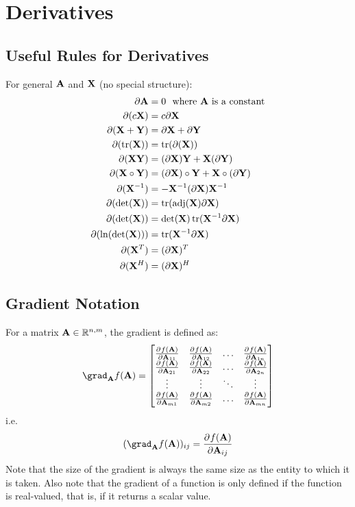 
\chapter{Derivatives}

\section{Useful Rules for Derivatives}
For general $\mathbf{A}$ and $\mathbf{X}$ (no special structure):
\begin{align}
\partial\mathbf{A}           &= 0~~\textrm{where $\mathbf{A}$ is a constant} \\
\partial(c\mathbf{X})        &= c\partial\mathbf{X}                          \\
\partial(\mathbf{X}+\mathbf{Y})     &= \partial\mathbf{X}+\partial\mathbf{Y}               \\
\partial(\operatorname{tr}(\mathbf{X})) &= \operatorname{tr}(\partial(\mathbf{X}))                 \\
\partial(\mathbf{X}\mathbf{Y})      &= (\partial\mathbf{X})\mathbf{Y} + \mathbf{X}(\partial\mathbf{Y})   \\
\partial(\mathbf{X}\circ\mathbf{Y}) &= (\partial\mathbf{X})\circ\mathbf{Y} + \mathbf{X}\circ(\partial\mathbf{Y}) \\
\partial(\mathbf{X}^{-1})    &= -\mathbf{X}^{-1}(\partial\mathbf{X})\mathbf{X}^{-1}        \\
\partial(\det(\mathbf{X}))   &= \operatorname{tr}(\textrm{adj}(\mathbf{X})\partial\mathbf{X})  \\
\partial(\det(\mathbf{X}))   &= \det(\mathbf{X})\operatorname{tr}(\mathbf{X}^{-1}\partial\mathbf{X})  \\
\partial(\ln(\det(\mathbf{X}))) &= \operatorname{tr}(\mathbf{X}^{-1}\partial\mathbf{X})        \\
\partial(\mathbf{X}^T)       &= (\partial\mathbf{X})^T                       \\
\partial(\mathbf{X}^H)       &= (\partial\mathbf{X})^H
\end{align}

\section{Gradient Notation}
For a matrix $\mathbf{A}\in\mathbb{R}^{n,m}$, the gradient is defined as:
\begin{equation}
\grad_\mA f(\mA)=
\begin{bmatrix}
\pd{f(\mA)}{\mA_{11}} & \pd{f(\mA)}{\mA_{12}} & \ldots & \pd{f(\mA)}{\mA_{1n}} \\
\pd{f(\mA)}{\mA_{21}} & \pd{f(\mA)}{\mA_{22}} & \ldots & \pd{f(\mA)}{\mA_{2n}} \\
\vdots                & \vdots                & \ddots & \vdots                \\
\pd{f(\mA)}{\mA_{m1}} & \pd{f(\mA)}{\mA_{m2}} & \ldots & \pd{f(\mA)}{\mA_{mn}}
\end{bmatrix}
\end{equation}
i.e.
\begin{equation}
(\grad_\mA f(\mA))_{ij}=\pd{f(\mA)}{\mA_{ij}}
\end{equation}
Note that the size of the gradient is always the same size as the entity to which it is taken. Also note that the gradient of a function is only defined if the function is real-valued, that is, if it returns a scalar value.

